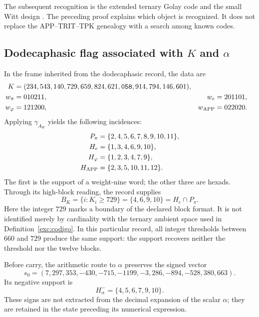The subsequent recognition is the extended ternary Golay code and
the small Witt design \cite{conwaysloane}. The preceding proof explains which object is
recognized. It does not replace the APP--TRIT--TPK genealogy with a search
among known codes.

\subsection{Dodecaphasic flag associated with \texorpdfstring{$K$ and $\alpha$}{K and alpha}}
\label{exc:bandera}

In the frame inherited from the dodecaphasic record, the data are
\begin{align}
 K={}&(234,543,140,729,659,824,621,\mathtt{058},914,794,146,601),
 \label{exc:k}\\
 w_\pi={}&010211, &w_e={}&201101,\nonumber\\
 w_\varphi={}&121200, &w_{\rm APP}={}&022020.\nonumber
\end{align}
Applying $\gamma_{A_W}$ yields the following incidences:
\begin{align*}
 P_\pi&=\{2,4,5,6,7,8,9,10,11\},\\
 H_e&=\{1,3,4,6,9,10\},\\
 H_\varphi&=\{1,2,3,4,7,9\},\\
 H_{\rm APP}&=\{2,3,5,10,11,12\}.
\end{align*}
The first is the support of a weight-nine word; the other three
are hexads. Through its high-block reading, the record supplies
\begin{equation}
 B_K=\{i:K_i\geq729\}=\{4,6,9,10\}=H_e\cap P_\pi.
 \label{exc:bk}
\end{equation}
Here the integer $729$ marks a boundary of the declared
block format. It is not identified merely by cardinality with the
ternary ambient space used in Definition~\ref{exc:codigo}. In this particular record, all
integer thresholds between $660$ and $729$ produce the same support:
the support recovers neither the threshold nor the twelve blocks.

Before carry, the arithmetic route to $\alpha$ preserves the
signed vector
\begin{equation}
 s_0=(7,297,353,-430,-715,-1199,-3,286,-894,-528,380,663).
 \label{exc:precarry}
\end{equation}
Its negative support is
\begin{equation}
 H^-_\alpha=\{4,5,6,7,9,10\}.
 \label{exc:halpha}
\end{equation}
These signs are not extracted from the decimal expansion of the scalar
$\alpha$; they are retained in the state preceding its numerical expression.

